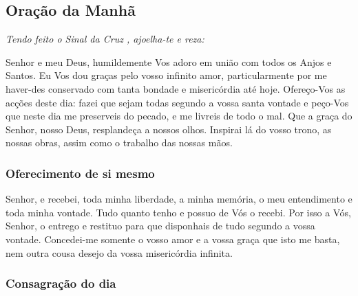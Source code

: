 \subsection{Oração da Manhã}\label{oracaomanha}

\emph{Tendo feito o Sinal da Cruz \cruz, ajoelha-te e reza:}

 Senhor e meu Deus, humildemente Vos adoro em união com todos os Anjos e Santos. Eu Vos dou graças pelo vosso infinito amor, particularmente por me haver-des conservado com tanta bondade e misericórdia até hoje. Ofereço-Vos as acções deste dia: fazei que sejam todas segundo a vossa santa vontade e peço-Vos que neste dia me preserveis do pecado, e me livreis de todo o mal. Que a graça do Senhor, nosso Deus, resplandeça a nossos olhos. Inspirai lá do vosso trono, as nossas obras, assim como o trabalho das nossas mãos.


\subsubsection{Oferecimento de si mesmo}\label{oferecimento}

 Senhor, e recebei, toda minha liberdade, a minha memória, o meu entendimento e toda minha vontade. Tudo quanto tenho e possuo de Vós o recebi. Por isso a Vós, Senhor, o entrego e restituo para que disponhais de tudo segundo a vossa vontade. Concedei-me somente o vosso amor e a vossa graça que isto me basta, nem outra cousa desejo da vossa misericórdia infinita.

\subsubsection{Consagração do dia}\label{consagracaodia}

\begin{paracol}{2}\switchcolumn{}\end{paracol}

